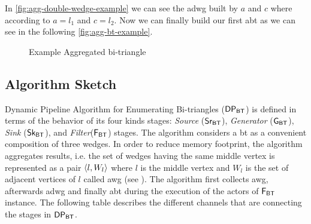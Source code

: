 In \autoref{fig:agg-double-wedge-example} we can see the \acrshort{adwg} built by $a$ and $c$ where according to  $a = l_1$ and $c = l_2$.
Now we can finally build our first \acrlong{abt} as we can see in the following \autoref{fig:agg-bt-example}.

\begin{figure}[htp!]
\centering      
{}
\caption[Example Aggregated bi-triangle]{Example Aggregated bi-triangle}
\label{fig:agg-bt-example}
\end{figure}


\subsection{Algorithm Sketch}\label{sub:sec:algo-sketch}
Dynamic Pipeline Algorithm for Enumerating Bi-triangles ($\mathsf{DP_{BT}}$) is defined in terms of the behavior of its four kinds stages: \textit{Source} ($\mathsf{Sr_{BT}}$),  
\textit{Generator} ($\mathsf{G_{BT}}$),  \textit{Sink} ($\mathsf{Sk_{BT}}$), and \textit{Filter}($\mathsf{F_{BT}}$) stages. 
The algorithm considers a \acrlong{bt} as a convenient composition of three wedges.
In order to reduce memory footprint, the algorithm aggregates results, i.e. the set of wedges having the same middle vertex is represented as a pair $\left\langle l, W_l \right\rangle$ where $l$ is the middle vertex and $W_l$ is the set of adjacent vertices of $l$ called \acrfull{awg} (see ).
The algorithm first collects \acrshort{awg}, afterwards \acrshort{adwg} and finally \acrshort{abt} during the execution of the actors of $\mathsf{F_{BT}}$ instance. 
The following table describes the different channels that are connecting the stages in $\mathsf{DP_{BT}}$.

